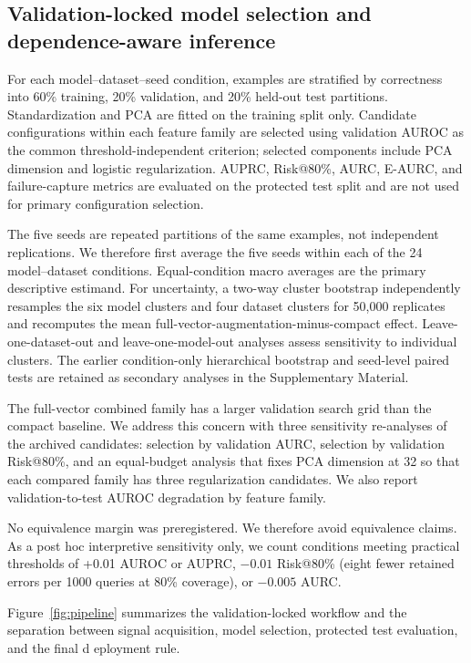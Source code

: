 \documentclass[preprint,12pt,authoryear]{elsarticle}
\begin{document}

\FloatBarrier

\subsection{Validation-locked model selection and dependence-aware inference}
For each model--dataset--seed condition, examples are stratified by correctness into 60\% training, 20\% validation, and 20\% held-out test partitions. Standardization and PCA are fitted on the training split only. Candidate configurations within each feature family are selected using validation AUROC as the common threshold-independent criterion; selected components include PCA dimension and logistic regularization. AUPRC, Risk@80\%, AURC, E-AURC, and failure-capture metrics are evaluated on the protected test split and are not used for primary configuration selection.

The five seeds are repeated partitions of the same examples, not independent replications. We therefore first average the five seeds within each of the 24 model--dataset conditions. Equal-condition macro averages are the primary descriptive estimand. For uncertainty, a two-way cluster bootstrap independently resamples the six model clusters and four dataset clusters for 50,000 replicates and recomputes the mean full-vector-augmentation-minus-compact effect. Leave-one-dataset-out and leave-one-model-out analyses assess sensitivity to individual clusters. The earlier condition-only hierarchical bootstrap and seed-level paired tests are retained as secondary analyses in the Supplementary Material.

The full-vector combined family has a larger validation search grid than the compact baseline. We address this concern with three sensitivity re-analyses of the archived candidates: selection by validation AURC, selection by validation Risk@80\%, and an equal-budget analysis that fixes PCA dimension at 32 so that each compared family has three regularization candidates. We also report validation-to-test AUROC degradation by feature family.

No equivalence margin was preregistered. We therefore avoid equivalence claims. As a post hoc interpretive sensitivity only, we count conditions meeting practical thresholds of +0.01 AUROC or AUPRC, $-0.01$ Risk@80\% (eight fewer retained errors per 1000 queries at 80\% coverage), or $-0.005$ AURC.

Figure~\ref{fig:pipeline} summarizes the validation-locked workflow and the separation between signal acquisition, model selection, protected test evaluation, and the final d eployment rule.
\end{document}
